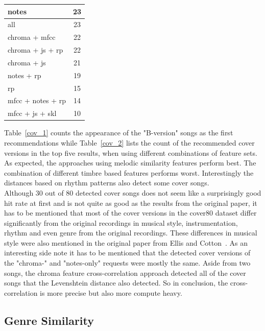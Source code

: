 \begin{table}[H]
\begin{minipage}{0.5\textwidth}
\begin{center}
\begin{tabular}{|l||c|}
				\hline
				notes & 23\\
				\hline
				all & 23\\
				\hline
				chroma + mfcc & 22\\
				\hline
				chroma + js + rp & 22\\
				\hline
				chroma + js & 21\\
				\hline
				notes + rp & 19\\
				\hline
				rp & 15\\
				\hline
				mfcc + notes + rp & 14\\
				\hline
				mfcc + js + skl & 10\\
				\hline
			\end{tabular}
		\end{center}
	\end{minipage}
\end{table}

\noindent Table~\ref{cov_1} counts the appearance of the "B-version" songs as the first recommendations while Table~\ref{cov_2} lists the count of the recommended cover versions in the top five results, when using different combinations of feature sets. As expected, the approaches using melodic similarity features perform best. The combination of different timbre based features performs worst. Interestingly the distances based on rhythm patterns also detect some cover songs.\\
\noindent Although 30 out of 80 detected cover songs does not seem like a surprisingly good hit rate at first and is not quite as good as the results from the original paper, it has to be mentioned that most of the cover versions in the cover80 dataset differ significantly from the original recordings in musical style, instrumentation, rhythm and even genre from the original recordings. These differences in musical style were also mentioned in the original paper from Ellis and Cotton~\cite[p. 3]{cover802}.
\noindent As an interesting side note it has to be mentioned that the detected cover versions of the "chroma-" and "notes-only" requests were mostly the same. Aside from two songs, the chroma feature cross-correlation approach detected all of the cover songs that the Levenshtein distance also detected. So in conclusion, the cross-correlation is more precise but also more compute heavy.


\subsection{Genre Similarity}\label{genrerec}

